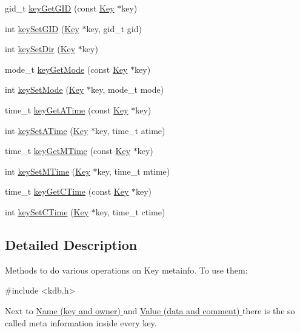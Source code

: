 \begin{DoxyCompactItemize}
\item 
gid\_\-t \hyperlink{group__keymeta_ga46a95e81d7d7f4e3eb59e60e5f3738c0}{keyGetGID} (const \hyperlink{struct__Key}{Key} $\ast$key)
\item 
int \hyperlink{group__keymeta_ga9e3d0fb3f7ba906e067727b9155d22e3}{keySetGID} (\hyperlink{struct__Key}{Key} $\ast$key, gid\_\-t gid)
\item 
int \hyperlink{group__keymeta_gaae575bd86a628a15ee45baa860522e75}{keySetDir} (\hyperlink{struct__Key}{Key} $\ast$key)
\item 
mode\_\-t \hyperlink{group__keymeta_gabc0cec592ce3b77e9bc33dbc8e8f6bdc}{keyGetMode} (const \hyperlink{struct__Key}{Key} $\ast$key)
\item 
int \hyperlink{group__keymeta_ga8803037e35b9da1ce492323a88ff6bc3}{keySetMode} (\hyperlink{struct__Key}{Key} $\ast$key, mode\_\-t mode)
\item 
time\_\-t \hyperlink{group__keymeta_ga6b05da399c3c78904969ef39f191b0eb}{keyGetATime} (const \hyperlink{struct__Key}{Key} $\ast$key)
\item 
int \hyperlink{group__keymeta_ga995d8b84731673c88c7c01f3fed538b9}{keySetATime} (\hyperlink{struct__Key}{Key} $\ast$key, time\_\-t atime)
\item 
time\_\-t \hyperlink{group__keymeta_ga57689eb5691679071463b777ae786ae9}{keyGetMTime} (const \hyperlink{struct__Key}{Key} $\ast$key)
\item 
int \hyperlink{group__keymeta_ga481d8997187992fe4bbf288bc8ef4db7}{keySetMTime} (\hyperlink{struct__Key}{Key} $\ast$key, time\_\-t mtime)
\item 
time\_\-t \hyperlink{group__keymeta_ga2c213c120cbe02201278ef7fb8cd94be}{keyGetCTime} (const \hyperlink{struct__Key}{Key} $\ast$key)
\item 
int \hyperlink{group__keymeta_ga9f502ecab8ab43f0b17220fcc95f3fa5}{keySetCTime} (\hyperlink{struct__Key}{Key} $\ast$key, time\_\-t ctime)
\end{DoxyCompactItemize}


\subsection{Detailed Description}
Methods to do various operations on Key metainfo. To use them: 
\begin{DoxyCode}
#include <kdb.h>
\end{DoxyCode}


Next to \hyperlink{group__keyname}{Name (key and owner) } and \hyperlink{group__keyvalue}{Value (data and comment) } there is the so called meta information inside every key.

